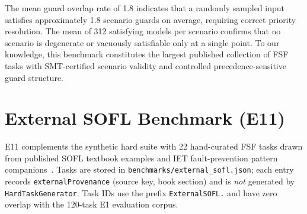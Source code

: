 The mean guard overlap rate of 1.8 indicates that a randomly sampled input
satisfies approximately 1.8 scenario guards on average, requiring correct
priority resolution.  The mean of 312 satisfying models per scenario confirms
that no scenario is degenerate or vacuously satisfiable only at a single
point.  To our knowledge, this benchmark constitutes the largest published
collection of FSF tasks with SMT-certified scenario validity and controlled
precedence-sensitive guard structure.

\section{External SOFL Benchmark (E11)}
\label{sec:bench:e11}

E11 complements the synthetic hard suite with 22 hand-curated FSF tasks drawn
from published SOFL textbook examples and IET fault-prevention pattern
companions~\citep{liu2004soflbook,li2022qrs_companion,li2023iet_faultprevention}.
Tasks are stored in \texttt{benchmarks/external\_sofl.json}; each entry records
\texttt{externalProvenance} (source key, book section) and is \emph{not}
generated by \texttt{HardTaskGenerator}.
Task IDs use the prefix \texttt{ExternalSOFL.} and have zero overlap with the
120-task E1 evaluation corpus.

